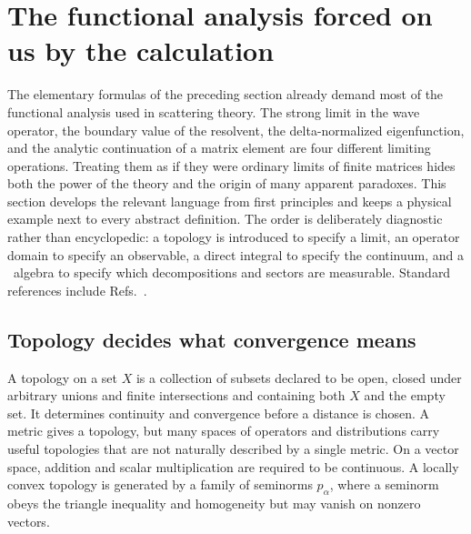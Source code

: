 \section{The functional analysis forced on us by the calculation}
\label{sec:functional-operator-algebra}

The elementary formulas of the preceding section already demand most of the
functional analysis used in scattering theory.  The strong limit in the wave
operator, the boundary value of the resolvent, the delta-normalized
eigenfunction, and the analytic continuation of a matrix element are four
different limiting operations.  Treating them as if they were ordinary limits
of finite matrices hides both the power of the theory and the origin of many
apparent paradoxes.  This section develops the relevant language from first
principles and keeps a physical example next to every abstract definition.
The order is deliberately diagnostic rather than encyclopedic: a topology is
introduced to specify a limit, an operator domain to specify an observable, a
direct integral to specify the continuum, and a \vN\ algebra to specify
which decompositions and sectors are measurable.
Standard references include Refs.~\cite{ReedSimonI:1980,Takesaki:2002,
vonNeumann:1949Reduction,Yafaev:1992,Haag:1996}.

\subsection{Topology decides what convergence means}
\label{subsec:topology-convergence}

A topology on a set $X$ is a collection of subsets declared to be open, closed
under arbitrary unions and finite intersections and containing both $X$ and
the empty set.  It determines continuity and convergence before a distance is
chosen.  A metric gives a topology, but many spaces of operators and
distributions carry useful topologies that are not naturally described by a
single metric.  On a vector space, addition and scalar multiplication are
required to be continuous.  A locally convex topology is generated by a
family of seminorms $p_\alpha$, where a seminorm obeys the triangle inequality
and homogeneity but may vanish on nonzero vectors.

